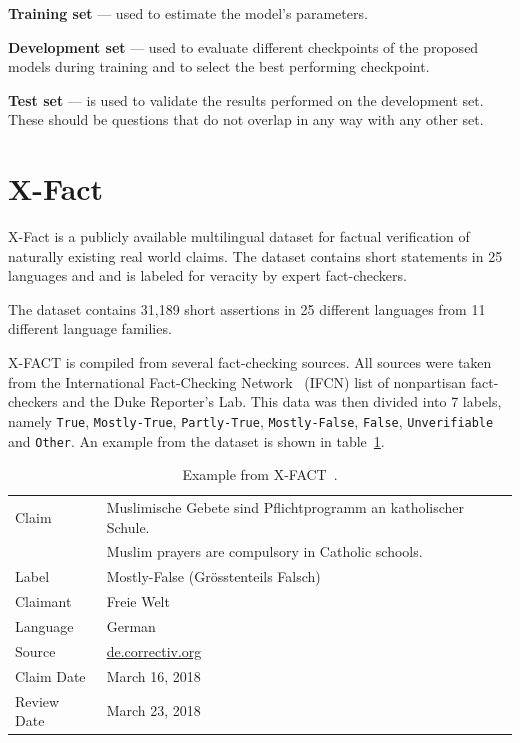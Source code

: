 \noindent\textbf{Training set} --- used to estimate the model's parameters.

\noindent\textbf{Development set} --- used to evaluate different checkpoints of the proposed models during training and to select the best performing checkpoint.

\noindent\textbf{Test set} --- is used to validate the results performed on the development set. These should be questions that do not overlap in any way with any other set.

\section{X-Fact}
X-Fact \cite{x-fact} is a publicly available multilingual dataset for factual verification of naturally existing real world claims. The dataset contains short statements in 25 languages and and is labeled for veracity by expert fact-checkers.

The dataset contains 31,189 short assertions in 25 different languages from 11 different language families.

X-FACT is compiled from several fact-checking sources. All sources were taken from the International Fact-Checking Network~\cite{IFCN2} (IFCN) list of nonpartisan fact-checkers and the Duke Reporter's Lab. This data was then divided into 7 labels, namely \texttt{True}, \texttt{Mostly-True}, \texttt{Partly-True}, \texttt{Mostly-False}, \texttt{False}, \texttt{Unverifiable} and \texttt{Other}. An example from the dataset is shown in table~\ref{tab:x-fact}.

\begin{table}[h]
    \centering
    \begin{tabular}{l|l}
        \hline
        Claim & Muslimische Gebete sind Pflichtprogramm an katholischer Schule. \\
         & Muslim prayers are compulsory in Catholic schools. \\
        Label & Mostly-False (Grösstenteils Falsch) \\
        Claimant & Freie Welt\\
        Language & German\\
        Source & \url{de.correctiv.org}\\
        Claim Date & March 16, 2018\\
        Review Date & March 23, 2018\\
        \hline
    \end{tabular}
    \caption{Example from X-FACT~\cite{x-fact}.}
    \label{tab:x-fact}
\end{table}

